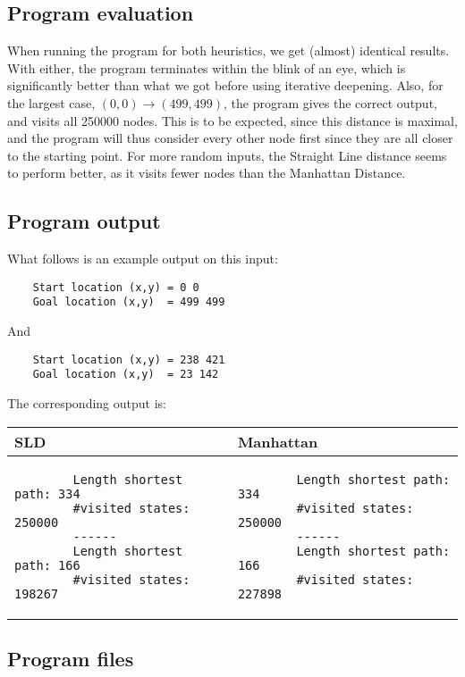\documentclass{article}
\begin{document}
	\subsection*{Program evaluation}
	When running the program for both heuristics, we get (almost) identical results. With either, the program terminates within the blink of an eye, which is significantly better than what we got before using iterative deepening. Also, for the largest case, $(0,0)\rightarrow (499,499)$, the program gives the correct output, and visits all 250000 nodes. This is to be expected, since this distance is maximal, and the program will thus consider every other node first since they are all closer to the starting point. For more random inputs, the Straight Line distance seems to perform better, as it visits fewer nodes than the Manhattan Distance.
	
	\subsection*{Program output}
	What follows is an example output on this input:
	\begin{verbatim}
	Start location (x,y) = 0 0
	Goal location (x,y)  = 499 499
	\end{verbatim}
	And
	\begin{verbatim}
	Start location (x,y) = 238 421
	Goal location (x,y)  = 23 142
	\end{verbatim}
	The corresponding output is:\\
	\begin{tabular}{m{5cm}|m{5cm}}
		SLD & Manhattan\\\hline
		\begin{verbatim}
		Length shortest path: 334
		#visited states: 250000
		------
		Length shortest path: 166
		#visited states: 198267
		\end{verbatim}
		&
		\begin{verbatim}
		Length shortest path: 334
		#visited states: 250000
		------
		Length shortest path: 166
		#visited states: 227898
		\end{verbatim}
	\end{tabular}
	
	\subsection*{Program files}
\end{document}
